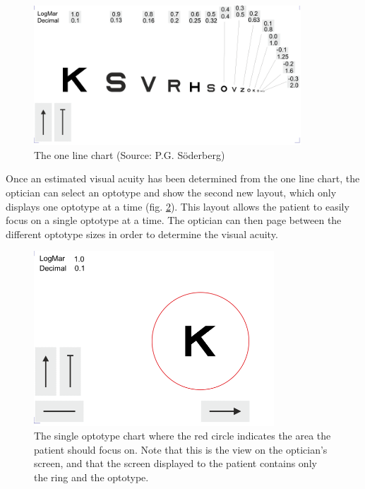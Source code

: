 \documentclass[12pt,a4paper,notitlepage]{report}
\begin{document}
\begin{figure}[ht!]
\centering
\includegraphics[width=100mm]{images/etdrs_one_line.png}
\caption[One-line eye chart]{The one line chart (Source: P.G. Söderberg)}
\label{fig:etdrs_one_line}
\end{figure}

\pagebreak
Once an estimated visual acuity has been determined from the one line chart, the optician can select an optotype and show the second new layout, which only displays one optotype at a time (fig. \ref{fig:etdrs_single}). This layout allows the patient to easily focus on a single optotype at a time. The optician can then page between the different optotype sizes in order to determine the visual acuity.

\begin{figure}[ht!  ]
\centering
\includegraphics[width=90mm]{images/etdrs_single.png}
\caption[Single optotype chart]{The single optotype chart where the red circle indicates the area the patient should focus on. Note that this is the view on the optician's screen, and that the screen displayed to the patient contains only the ring and the optotype.}
\label{fig:etdrs_single}
\end{figure}
\end{document}
